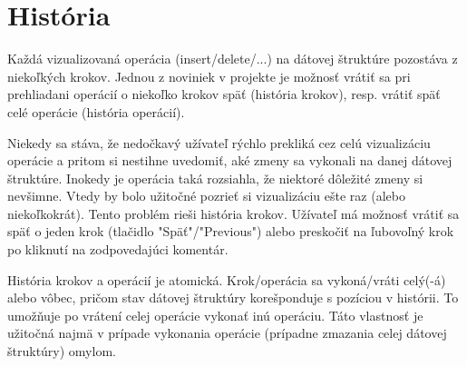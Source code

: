 \section{História}
Každá vizualizovaná operácia (insert/delete/...) na dátovej štruktúre pozostáva
z niekoľkých krokov. Jednou z noviniek v projekte je možnosť vrátiť sa pri
prehliadani operácií o niekoľko krokov späť (história krokov), resp. vrátiť späť
celé operácie (história operácií).

Niekedy sa stáva, že nedočkavý užívateľ rýchlo prekliká cez celú vizualizáciu
operácie a pritom si nestihne uvedomiť, aké zmeny sa vykonali na danej dátovej
štruktúre. Inokedy je operácia taká rozsiahla, že niektoré dôležité zmeny si
nevšimne. Vtedy by bolo užitočné pozrieť si vizualizáciu ešte raz (alebo
niekoľkokrát). Tento problém rieši história krokov. Užívateľ má možnosť vrátiť
sa späť o jeden krok (tlačidlo "Späť"/"Previous") alebo preskočiť na ľubovoľný
krok po kliknutí na zodpovedajúci komentár.

História krokov a operácií je atomická. Krok/operácia sa vykoná/vráti celý(-á)
alebo vôbec, pričom stav dátovej štruktúry korešponduje s pozíciou v histórii.
To umožňuje po vrátení celej operácie vykonať inú operáciu. Táto vlastnosť je
užitočná najmä v prípade vykonania operácie (prípadne zmazania celej dátovej
štruktúry) omylom.

